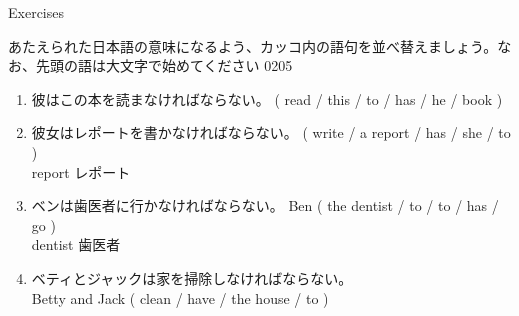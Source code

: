 \documentclass[aspectratio=169,xcolor={dvipsnames,table}]{beamer}
\newcommand{\myaudio}[1]{\href{#1}{\faVolumeUp}}
\begin{document}
\begin{frame}[plain]{Exercises}

{\small あたえられた日本語の意味になるよう、カッコ内の語句を並べ替えましょう。なお、先頭の語は大文字で始めてください}%
\hfill{\tiny 0205}\,{\scriptsize \myaudio{./audio/014_have_to_04.mp3}}
 \begin{enumerate}
  \item {\small 彼はこの本を読まなければならない。}
( read / this / to / has / he / book )\\
  \item {\small 彼女はレポートを書かなければならない。}
( write / a report / has / she / to )\\
\hfill{}{\scriptsize report  レポート}
  \item {\small ベンは歯医者に行かなければならない。}
Ben ( the dentist / to / to / has / go )\\
\hfill{}{\scriptsize dentist  歯医者}  
\item {\small ベティとジャックは家を掃除しなければならない。}\\
Betty and Jack  ( clean /  have / the house / to )\\
 \end{enumerate}
\end{frame}
\end{document}
